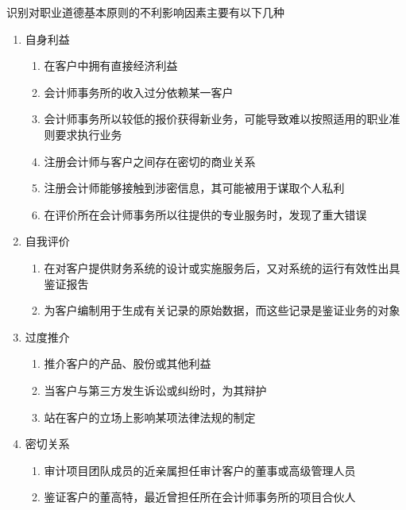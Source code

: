 \documentclass[UTF8,12pt]{ctexart}
\numberwithin{equation}{section} %
\numberwithin{figure}{section}
\numberwithin{table}{section}
\begin{document}
	识别对职业道德基本原则的不利影响因素主要有以下几种
	\begin{enumerate}
		\item 自身利益
		\begin{enumerate}
			\item 在客户中拥有直接经济利益
			
			\item 会计师事务所的收入过分依赖某一客户
			
			\item 会计师事务所以较低的报价获得新业务，可能导致难以按照适用的职业准则要求执行业务
			
			\item 注册会计师与客户之间存在密切的商业关系
			
			\item 注册会计师能够接触到涉密信息，其可能被用于谋取个人私利
			
			\item 在评价所在会计师事务所以往提供的专业服务时，发现了重大错误
		\end{enumerate}
		
		\item 自我评价
		\begin{enumerate}
			\item 在对客户提供财务系统的设计或实施服务后，又对系统的运行有效性出具鉴证报吿
			
			\item 为客户编制用于生成有关记录的原始数据，而这些记录是鉴证业务的对象
		\end{enumerate}
		
		\item 过度推介
		\begin{enumerate}
			\item 推介客户的产品、股份或其他利益
			
			\item 当客户与第三方发生诉讼或纠纷时，为其辩护
			
			\item 站在客户的立场上影响某项法律法规的制定
		\end{enumerate}
		
		\item 密切关系
		\begin{enumerate}
			\item 审计项目团队成员的近亲属担任审计客户的董事或高级管理人员
			
			\item 鉴证客户的董高特，最近曾担任所在会计师事务所的项目合伙人
			

\end{enumerate}
\end{enumerate}
\end{document}
